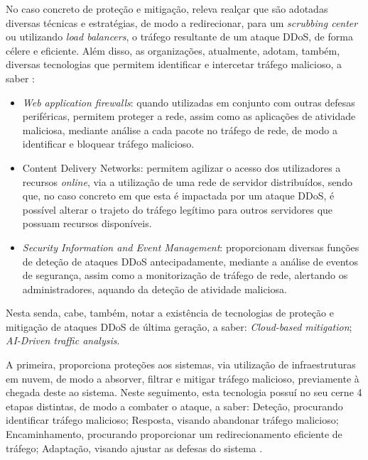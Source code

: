 No caso concreto de proteção e mitigação, releva realçar que são adotadas diversas técnicas e estratégias, de modo a redirecionar, para um \textit{scrubbing center} ou utilizando \textit{load balancers}, o tráfego resultante de um ataque DDoS, de forma célere e eficiente. Além disso, as organizações, atualmente, adotam, também, diversas tecnologias que permitem identificar e intercetar tráfego malicioso, a saber \cite{ibm_what_is_ddos}:
\begin{itemize}
    \item \textit{Web application firewalls}: quando utilizadas em conjunto com outras defesas periféricas, permitem proteger a rede, assim como as aplicações de atividade maliciosa, mediante análise a cada pacote no tráfego de rede, de modo a identificar e bloquear tráfego malicioso.
    \item Content Delivery Networks: permitem agilizar o acesso dos utilizadores a recursos \textit{online}, via a utilização de uma rede de servidor distribuídos, sendo que, no caso concreto em que esta é impactada por um ataque DDoS, é possível alterar o trajeto do tráfego legítimo para outros servidores que possuam recursos disponíveis.
    \item \textit{Security Information and Event Management}: proporcionam diversas funções de deteção de ataques DDoS antecipadamente, mediante a análise de eventos de segurança, assim como a monitorização de tráfego de rede, alertando os administradores, aquando da deteção de atividade maliciosa.
\end{itemize}

Nesta senda, cabe, também, notar a existência de tecnologias de proteção e mitigação de ataques DDoS de última geração, a saber: \textit{Cloud-based mitigation}; \textit{AI-Driven traffic analysis}.


A primeira, proporciona proteções aos sistemas, via utilização de infraestruturas em nuvem, de modo a absorver, filtrar e mitigar tráfego malicioso, previamente à chegada deste ao sistema. Neste seguimento, esta tecnologia possuí no seu cerne 4 etapas distintas, de modo a combater o ataque, a saber: Deteção, procurando identificar tráfego malicioso; Resposta, visando abandonar tráfego malicioso; Encaminhamento, procurando proporcionar um redirecionamento eficiente de tráfego; Adaptação, visando ajustar as defesas do sistema \cite{cloudflare_cloud_based_protection}.



